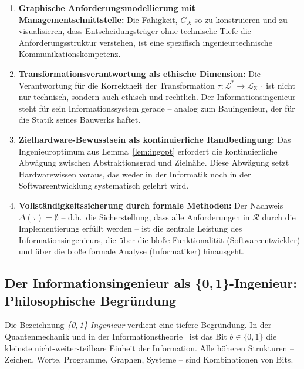 ﻿\documentclass[a4paper,12pt]{report}
\theoremstyle{definition}
\begin{document}
\begin{enumerate}
  \item \textbf{Graphische Anforderungsmodellierung mit Managementschnittstelle:}
        Die Fähigkeit, $G_\mathcal{R}$ so zu konstruieren und zu visualisieren, dass
        Entscheidungsträger ohne technische Tiefe die Anforderungsstruktur verstehen,
        ist eine spezifisch ingenieurtechnische Kommunikationskompetenz.

  \item \textbf{Transformationsverantwortung als ethische Dimension:}
        Die Verantwortung für die Korrektheit der Transformation
        $\tau: \mathcal{L}^* \to \mathcal{L}_{\text{Ziel}}$ ist nicht nur technisch,
        sondern auch ethisch und rechtlich. Der Informationsingenieur steht für sein
        Informationssystem gerade -- analog zum Bauingenieur, der für die Statik seines
        Bauwerks haftet.

  \item \textbf{Zielhardware-Bewusstsein als kontinuierliche Randbedingung:}
        Das Ingenieuroptimum aus Lemma~\ref{lem:ingopt} erfordert die kontinuierliche
        Abwägung zwischen Abstraktionsgrad und Zielnähe. Diese Abwägung setzt
        Hardwarewissen voraus, das weder in der Informatik noch in der
        Softwareentwicklung systematisch gelehrt wird.

  \item \textbf{Vollständigkeitssicherung durch formale Methoden:}
        Der Nachweis $\Delta(\tau) = \emptyset$ -- d.h.\ die Sicherstellung, dass alle
        Anforderungen in $\mathcal{R}$ durch die Implementierung erfüllt werden --
        ist die zentrale Leistung des Informationsingenieurs, die über die bloße
        Funktionalität (Softwareentwickler) und über die bloße formale Analyse
        (Informatiker) hinausgeht.
\end{enumerate}

\subsection{Der Informationsingenieur als \{0,\,1\}-Ingenieur: Philosophische Begründung}

Die Bezeichnung \emph{\{0,\,1\}-Ingenieur} verdient eine tiefere Begründung.
In der Quantenmechanik und in der Informationstheorie~\cite{shannon1948} ist das Bit
$b \in \{0,1\}$ die kleinste nicht-weiter-teilbare Einheit der Information. Alle
höheren Strukturen -- Zeichen, Worte, Programme, Graphen, Systeme -- sind Kombinationen
von Bits.
\end{document}

